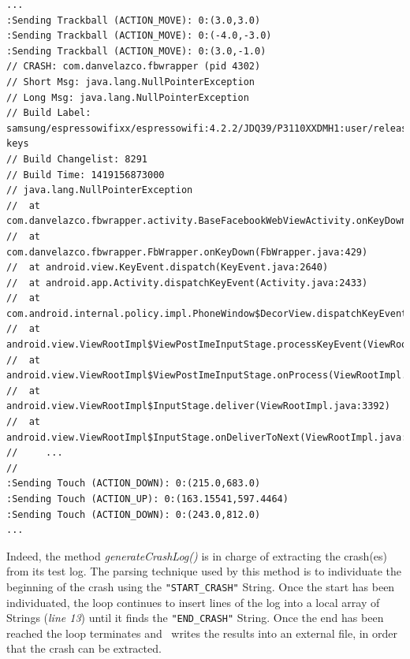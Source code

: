 \begin{lstlisting}[caption=Crash log of com.danvelazco.fbwrapper illustrated within its test log, basicstyle=\fontsize{6}{8}\ttfamily,label={lst:crashlog}]
...
:Sending Trackball (ACTION_MOVE): 0:(3.0,3.0)
:Sending Trackball (ACTION_MOVE): 0:(-4.0,-3.0)
:Sending Trackball (ACTION_MOVE): 0:(3.0,-1.0)
// CRASH: com.danvelazco.fbwrapper (pid 4302)
// Short Msg: java.lang.NullPointerException
// Long Msg: java.lang.NullPointerException
// Build Label: samsung/espressowifixx/espressowifi:4.2.2/JDQ39/P3110XXDMH1:user/release-keys
// Build Changelist: 8291
// Build Time: 1419156873000
// java.lang.NullPointerException
// 	at com.danvelazco.fbwrapper.activity.BaseFacebookWebViewActivity.onKeyDown(BaseFacebookWebViewActivity.java:649)
// 	at com.danvelazco.fbwrapper.FbWrapper.onKeyDown(FbWrapper.java:429)
// 	at android.view.KeyEvent.dispatch(KeyEvent.java:2640)
// 	at android.app.Activity.dispatchKeyEvent(Activity.java:2433)
// 	at com.android.internal.policy.impl.PhoneWindow$DecorView.dispatchKeyEvent(PhoneWindow.java:2021)
// 	at android.view.ViewRootImpl$ViewPostImeInputStage.processKeyEvent(ViewRootImpl.java:3845)
// 	at android.view.ViewRootImpl$ViewPostImeInputStage.onProcess(ViewRootImpl.java:3819)
// 	at android.view.ViewRootImpl$InputStage.deliver(ViewRootImpl.java:3392)
// 	at android.view.ViewRootImpl$InputStage.onDeliverToNext(ViewRootImpl.java:3442)
//     ...
//
:Sending Touch (ACTION_DOWN): 0:(215.0,683.0)
:Sending Touch (ACTION_UP): 0:(163.15541,597.4464)
:Sending Touch (ACTION_DOWN): 0:(243.0,812.0)
...

\end{lstlisting} 
Indeed, the method \textit{generateCrashLog()} 
is in charge of extracting the crash(es) from its test log. The parsing technique used by this method is to individuate the beginning of the crash using the \texttt{"START\_CRASH"}  String. Once the start has been individuated, the loop continues to insert lines of the log	into a local array of Strings (\textit{line 13}) until it finds the \texttt{"END\_CRASH"} String. Once the end has been reached the loop terminates and \Cmd\ writes the results into an external file, in order that the crash can be extracted. 

